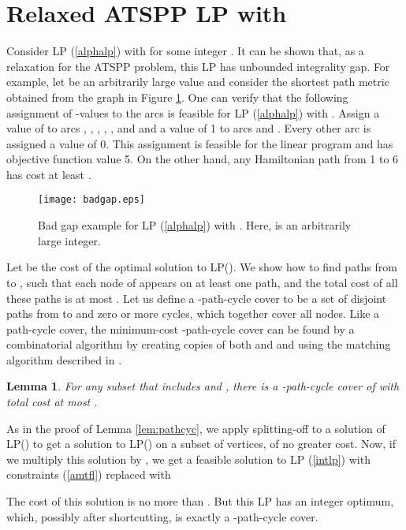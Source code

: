 \documentclass[11pt]{article}
\newcommand{\qed}{\hspace*{\fill}}
\newtheorem{lemma}[theorem]{Lemma}
\newenvironment{proof}[1][Proof. ]{\noindent {\bf #1 }}{\qed}
\begin{document}
\section{Relaxed ATSPP LP with } \label{sec:atspp-alpha2}

Consider LP (\ref{alphalp}) with  for some integer . 
It can be shown that, as a relaxation for the ATSPP problem, this LP has unbounded integrality gap.
For example, let  be an arbitrarily large value and consider the shortest path metric obtained from
the graph in Figure \ref{fig:badgap}. One can verify that the following assignment of -values
to the arcs is feasible for LP (\ref{alphalp}) with .
Assign a value of  to arcs , , , , , 
and  and a value of 1 to arcs  and .
Every other arc is assigned a value of 0. This assignment is feasible for the linear program and
has objective function value 5. On the other hand, any Hamiltonian path
from 1 to 6 has cost at least .


\begin{figure}
\begin{center}
\texttt{[image: badgap.eps]}
\caption{Bad gap example for LP (\ref{alphalp}) with . Here,  is an arbitrarily large integer.}\label{fig:badgap}
\end{center}
\end{figure}

Let  be the cost of the optimal solution to LP(). We show 
how to find  paths from  to , such that each node of  appears on at least 
one path, and the total cost of all these paths is at most . Let us define a 
-path-cycle cover to be a set of  disjoint 
paths from  to  and zero or more cycles, which together cover all nodes. 
Like a path-cycle cover, the minimum-cost -path-cycle cover can be found by a combinatorial algorithm
by creating  copies of both  and  and using the matching algorithm described in \cite{lam:newman}.

\begin{lemma} \label{lem:kpathcyc}
For any subset  that includes  and , there is a 
-path-cycle cover of  with total cost at most .
\end{lemma}
\begin{proof}
As in the proof of Lemma \ref{lem:pathcyc}, we apply splitting-off to a solution of LP() to get a solution to LP() on a subset  of vertices, of 
no greater cost. Now, if we multiply this solution by , we get a feasible solution to 
LP (\ref{intlp}) with constraints (\ref{amtfl}) replaced with 

The cost of this solution is no more than . 
But this LP has an integer optimum, which, possibly after shortcutting, is exactly a -path-cycle cover. 
\end{proof}
\end{document}

